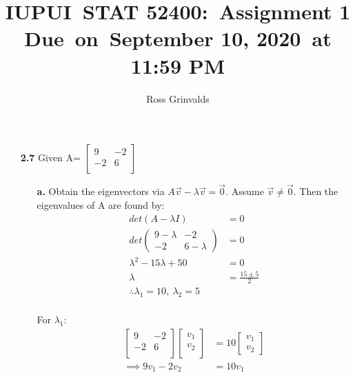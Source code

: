 \documentclass[oneside,12pt,letterpaper]{article}
\newcommand{\hmwkTitle}{Assignment 1}
\newcommand{\hmwkDueDate}{September 10, 2020}
\newcommand{\hmwkSchool}{IUPUI}
\newcommand{\hmwkClass}{STAT 52400}
\newcommand{\hmwkAuthorName}{Ross Grinvalds}
\begin{document}
	\title{
			\vspace{1in}
			\textmd{\textbf{\hmwkSchool\ \hmwkClass:\ \hmwkTitle}}\\
			\normalsize\vspace{0.1in}\small{Due\ on\ \hmwkDueDate\ at 11:59 PM}\\
			\vspace{6in}
	}
	\author{\hmwkAuthorName}
	\date{}
	\maketitle

	\pagebreak
	\begin{enumerate}
		\item[\textbf{2.7}]
			Given A=
			$\begin{bmatrix}
				9 & -2 \\
				-2 & 6 \\
			\end{bmatrix}$

			\begin{enumerate}
				\item[\textbf{a.}]
					Obtain the eigenvectors via $A\vec{v}-\lambda\vec{v}=\vec{0}$. Assume $\vec{v}\neq\vec{0}$. Then the eigenvalues of A are found by:
					\begin{align*}
						det(A - \lambda I) &= 0 \\
						det\begin{pmatrix} 9 - \lambda & -2 \\ -2 & 6 - \lambda \end{pmatrix} &= 0 \\
						\lambda^2 - 15\lambda + 50 &= 0 \\
						\lambda &= \frac{15 \pm 5}{2} \\
						\therefore \lambda_{1} = 10,\ \lambda_{2} = 5 \\
					\end{align*}
					
					For $\lambda_{1}$:
					\begin{align*}
						\begin{bmatrix} 9 & -2 \\ -2 & 6 \\ \end{bmatrix} \begin{bmatrix}	v_{1} \\ v_{2} \\\end{bmatrix} & =10 \begin{bmatrix}v_{1} \\ v_{2} \end{bmatrix} \\
						\implies 9 v_{1} -2 v_{2} &= 10 v_{1}
					\end{align*}
					

\end{enumerate}
\end{enumerate}
\end{document}
